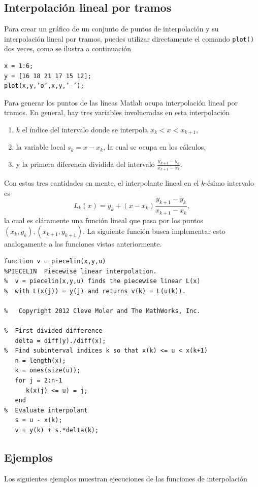 \documentclass[11pt]{article}
\begin{document}
\subsection{Interpolaci\'on lineal por tramos}
Para crear un gr\'afico de un conjunto de puntos de interpolaci\'on y su interpolaci\'on lineal por tramos, puedes utilizar directamente el comando \texttt{plot()} dos veces, como se ilustra a continuaci\'on
\begin{verbatim}
x = 1:6;
y = [16 18 21 17 15 12];
plot(x,y,’o’,x,y,’-’);
\end{verbatim}
Para generar los puntos de las l\'ineas Matlab ocupa interpolaci\'on lineal por tramos. En general, hay tres variables involucradas en esta interpolaci\'on
\begin{enumerate}
\item $k$ el \'indice del intervalo donde se interpola  $x_k<x<x_{k+1}$,
\item la variable local $s_k=x-x_k$, la cual se ocupa en los c\'alculos, 
\item y la primera diferencia dividida del intervalo $\frac{y_{k+1}-y_k}{x_{k+1}-x_k}$.
\end{enumerate}
Con estas tres cantidades en mente, el interpolante lineal en el $k$-\'esimo intervalo es
$$
L_k(x)=y_k+(x-x_k)\frac{y_{k+1}-y_k}{x_{k+1}-x_k},
$$
la cual es cl\'aramente una funci\'on lineal que pasa por los puntos $(x_k,y_k),(x_{k+1},y_{k+1})$.  La siguiente funci\'on busca implementar esto analogamente a las funciones vistas anteriormente.
\begin{verbatim}
function v = piecelin(x,y,u)
%PIECELIN  Piecewise linear interpolation.
%  v = piecelin(x,y,u) finds the piecewise linear L(x)
%  with L(x(j)) = y(j) and returns v(k) = L(u(k)).

%   Copyright 2012 Cleve Moler and The MathWorks, Inc.

%  First divided difference
   delta = diff(y)./diff(x);
%  Find subinterval indices k so that x(k) <= u < x(k+1)
   n = length(x);
   k = ones(size(u));
   for j = 2:n-1
      k(x(j) <= u) = j;
   end
%  Evaluate interpolant
   s = u - x(k);
   v = y(k) + s.*delta(k);
\end{verbatim}

\newpage
\subsection{Ejemplos}

Los siguientes ejemplos muestran ejecuciones de las funciones de interpolaci\'on
\end{document}
